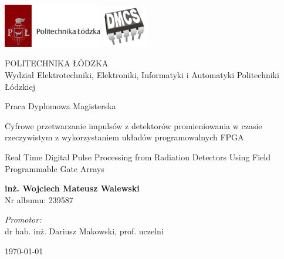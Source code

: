 \begin{titlepage}

\includegraphics[width=4.3cm]{media/unilogo.png}
\hspace{\fill}
\includegraphics[width=2cm]{media/faculty.jpg}

\begin{center}
POLITECHNIKA ŁÓDZKA \\
Wydział Elektrotechniki, Elektroniki, Informatyki i Automatyki Politechniki Łódzkiej
\end{center}

\vspace{32pt}

\begin{center}
{\Large Praca Dyplomowa Magisterska}

\vspace{24pt}

{\LARGE Cyfrowe przetwarzanie impulsów z detektorów promieniowania w czasie rzeczywistym z wykorzystaniem układów programowalnych FPGA}

\vspace{16pt}

{\LARGE Real Time Digital Pulse Processing from Radiation Detectors Using Field Programmable Gate Arrays}

\vspace{32pt}

{ \bfseries inż. Wojciech Mateusz Walewski } \\
Nr albumu: 239587

\vspace{48pt}

\begin{minipage}{0.8\textwidth}
\begin{flushright} 
\emph{Promotor:} \\
dr hab. inż. Dariusz Makowski, prof. uczelni\\
\end{flushright}
\end{minipage}

\vfill


{\today}


\end{center}
\end{titlepage}

